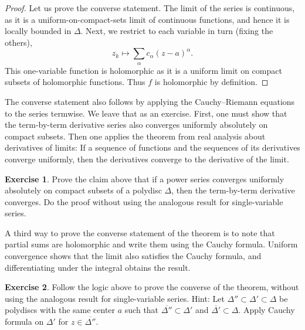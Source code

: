 \documentclass[12pt,openany]{book}
\theoremstyle{plain}
\theoremstyle{remark}
\theoremstyle{definition}
\newenvironment{exbox}{%
    \def\FrameCommand{\vrule width 1pt \relax\hspace{10pt}}%
    \MakeFramed{\advance\hsize-\width\FrameRestore}%
}{%
    \endMakeFramed
}
\theoremstyle{exercise}
\newtheorem{exercise}{Exercise}[section]
\theoremstyle{example}
\begin{document}
\begin{proof}
Let us prove the converse statement.
The limit of the series
is continuous, as it is a uniform-on-compact-sets limit of continuous
functions, and hence it is locally bounded in $\Delta$.  Next,
we restrict to each variable in turn (fixing the others),
\begin{equation*}
z_k \mapsto \sum_{\alpha} c_\alpha {(z-a)}^\alpha .
\end{equation*}
This one-variable function is holomorphic as it is a uniform limit on compact subsets of
holomorphic functions.  Thus $f$ is holomorphic by definition.
\end{proof}

The converse statement also follows by applying the Cauchy--Riemann
equations to the series termwise.
We leave that as an exercise.
First, one must show that the term-by-term derivative
series also converges uniformly absolutely on compact subsets.
Then one applies the theorem from real analysis about derivatives
of limits: If a sequence of functions and the sequences of its derivatives converge
uniformly, then the derivatives converge to the derivative of the limit.

\begin{exbox}
\begin{exercise}
Prove the claim above that if a power series converges uniformly absolutely
on compact subsets of a polydisc $\Delta$, then the term-by-term derivative
converges.
Do the proof without using the analogous result for single-variable series.
\end{exercise}
\end{exbox}

\pagebreak[1]
A third way to prove the converse statement of the theorem
is to note that partial sums are
holomorphic and write them using the Cauchy formula.  Uniform
convergence shows that the limit also satisfies the Cauchy formula, and
differentiating under the integral obtains the result.

\begin{exbox}
\begin{exercise}
Follow the logic above to prove the converse of the
theorem,
without using the analogous result for single-variable series.
Hint:
Let
$\Delta'' \subset \Delta' \subset \Delta$
be polydiscs with the same center $a$
such that $\overline{\Delta''} \subset \Delta'$
and $\overline{\Delta'} \subset \Delta$.
Apply Cauchy formula on $\Delta'$
for $z \in \overline{\Delta''}$.
\end{exercise}
\end{exbox}
\end{document}
